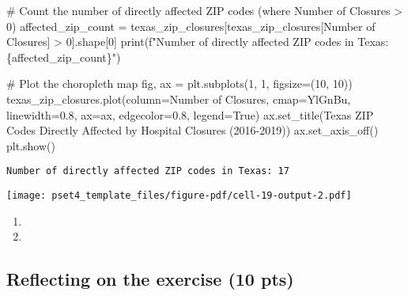 \documentclass[
  letterpaper,
  DIV=11,
  numbers=noendperiod]{scrartcl}
\newenvironment{Shaded}{\begin{snugshade}}{\end{snugshade}}
\newcommand{\BuiltInTok}[1]{\textcolor[rgb]{0.00,0.23,0.31}{#1}}
\newcommand{\CommentTok}[1]{\textcolor[rgb]{0.37,0.37,0.37}{#1}}
\newcommand{\DecValTok}[1]{\textcolor[rgb]{0.68,0.00,0.00}{#1}}
\newcommand{\FloatTok}[1]{\textcolor[rgb]{0.68,0.00,0.00}{#1}}
\newcommand{\NormalTok}[1]{\textcolor[rgb]{0.00,0.23,0.31}{#1}}
\newcommand{\OperatorTok}[1]{\textcolor[rgb]{0.37,0.37,0.37}{#1}}
\newcommand{\SpecialCharTok}[1]{\textcolor[rgb]{0.37,0.37,0.37}{#1}}
\newcommand{\SpecialStringTok}[1]{\textcolor[rgb]{0.13,0.47,0.30}{#1}}
\newcommand{\StringTok}[1]{\textcolor[rgb]{0.13,0.47,0.30}{#1}}
\newcommand{\VariableTok}[1]{\textcolor[rgb]{0.07,0.07,0.07}{#1}}
\providecommand{\tightlist}{%
  \setlength{\itemsep}{0pt}\setlength{\parskip}{0pt}}\usepackage{longtable,booktabs,array}
\begin{document}
\begin{Shaded}
\begin{Highlighting}[]
\CommentTok{\# Count the number of directly affected ZIP codes (where Number of Closures \textgreater{} 0)}
\NormalTok{affected\_zip\_count }\OperatorTok{=}\NormalTok{ texas\_zip\_closures[texas\_zip\_closures[}\StringTok{\textquotesingle{}Number of Closures\textquotesingle{}}\NormalTok{] }\OperatorTok{\textgreater{}} \DecValTok{0}\NormalTok{].shape[}\DecValTok{0}\NormalTok{]}
\BuiltInTok{print}\NormalTok{(}\SpecialStringTok{f"Number of directly affected ZIP codes in Texas: }\SpecialCharTok{\{}\NormalTok{affected\_zip\_count}\SpecialCharTok{\}}\SpecialStringTok{"}\NormalTok{)}

\CommentTok{\# Plot the choropleth map}
\NormalTok{fig, ax }\OperatorTok{=}\NormalTok{ plt.subplots(}\DecValTok{1}\NormalTok{, }\DecValTok{1}\NormalTok{, figsize}\OperatorTok{=}\NormalTok{(}\DecValTok{10}\NormalTok{, }\DecValTok{10}\NormalTok{))}
\NormalTok{texas\_zip\_closures.plot(column}\OperatorTok{=}\StringTok{\textquotesingle{}Number of Closures\textquotesingle{}}\NormalTok{, cmap}\OperatorTok{=}\StringTok{\textquotesingle{}YlGnBu\textquotesingle{}}\NormalTok{, linewidth}\OperatorTok{=}\FloatTok{0.8}\NormalTok{, ax}\OperatorTok{=}\NormalTok{ax, edgecolor}\OperatorTok{=}\StringTok{\textquotesingle{}0.8\textquotesingle{}}\NormalTok{, legend}\OperatorTok{=}\VariableTok{True}\NormalTok{)}
\NormalTok{ax.set\_title(}\StringTok{\textquotesingle{}Texas ZIP Codes Directly Affected by Hospital Closures (2016{-}2019)\textquotesingle{}}\NormalTok{)}
\NormalTok{ax.set\_axis\_off()}
\NormalTok{plt.show()}
\end{Highlighting}
\end{Shaded}

\begin{verbatim}
Number of directly affected ZIP codes in Texas: 17
\end{verbatim}

\texttt{[image: pset4\_template\_files/figure-pdf/cell-19-output-2.pdf]}

\begin{enumerate}
\def\labelenumi{\arabic{enumi}.}
\setcounter{enumi}{2}
\tightlist
\item
\item
\end{enumerate}

\subsection{Reflecting on the exercise (10
pts)}\label{reflecting-on-the-exercise-10-pts}
\end{document}
